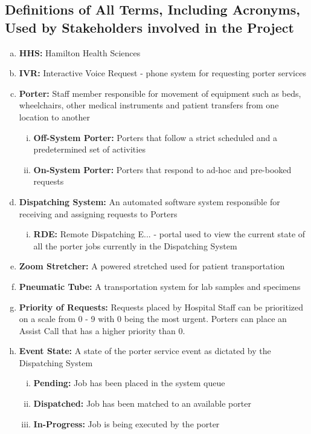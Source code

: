 \documentclass[paper=letter, fontsize=10pt]{scrartcl}
\numberwithin{equation}{section}		%
\numberwithin{figure}{section}			%
\numberwithin{table}{section}				%
\begin{document}
\subsection{Definitions of All Terms, Including Acronyms, Used by Stakeholders involved in the Project}
\begin{enumerate}[(a)]
	\item \textbf{HHS:} Hamilton Health Sciences
	\item \textbf{IVR:} Interactive Voice Request - phone system for requesting porter services
	\item \textbf{Porter:} Staff member responsible for movement of equipment such as beds, wheelchairs, other medical instruments and patient transfers from one location to another
	\begin{enumerate}[(i)]
		\item \textbf{Off-System Porter:} Porters that follow a strict scheduled and a predetermined set of activities
		\item \textbf{On-System Porter:} Porters that respond to ad-hoc and pre-booked requests	
	\end{enumerate}
	\item \textbf{Dispatching System:} An automated software system responsible for receiving and assigning requests to Porters
	\begin{enumerate}[(i)]
		\item \textbf{RDE:} Remote Dispatching E... - portal used to view the current state of all the porter jobs currently in the Dispatching System
	\end{enumerate}
	\item \textbf{Zoom Stretcher:} A powered stretched used for patient transportation
	\item \textbf{Pneumatic Tube:} A transportation system for lab samples and specimens
	\item \textbf{Priority of Requests:} Requests placed by Hospital Staff can be prioritized on a scale from 0 - 9 with 0 being the most urgent. Porters can place an Assist Call that has a higher priority than 0.
	\item \textbf{Event State:} A state of the porter service event as dictated by the Dispatching System
	\begin{enumerate}[(i)]
		\item \textbf{Pending:} Job has been placed in the system queue
		\item \textbf{Dispatched:} Job has been matched to an available porter
		\item \textbf{In-Progress:} Job is being executed by the porter

\end{enumerate}
\end{enumerate}
\end{document}
